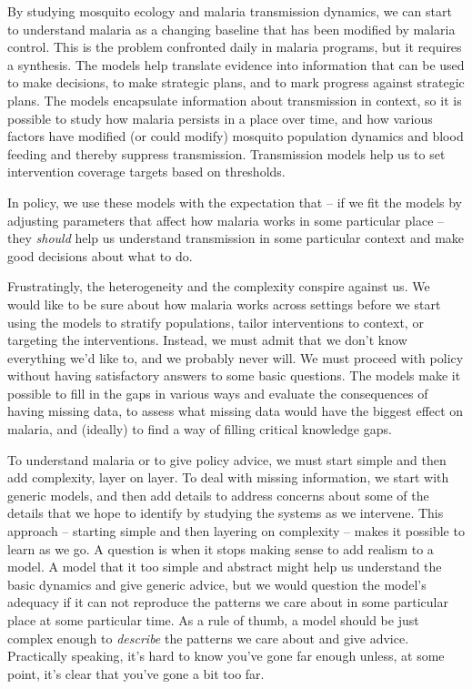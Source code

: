 \documentclass[
]{book}
\begin{document}
By studying mosquito ecology and malaria transmission dynamics, we can start to understand malaria as a changing baseline that has been modified by malaria control. This is the problem confronted daily in malaria programs, but it requires a synthesis. The models help translate evidence into information that can be used to make decisions, to make strategic plans, and to mark progress against strategic plans. The models encapsulate information about transmission in context, so it is possible to study how malaria persists in a place over time, and how various factors have modified (or could modify) mosquito population dynamics and blood feeding and thereby suppress transmission. Transmission models help us to set intervention coverage targets based on thresholds.

In policy, we use these models with the expectation that -- if we fit the models by adjusting parameters that affect how malaria works in some particular place -- they \emph{should} help us understand transmission in some particular context and make good decisions about what to do.

Frustratingly, the heterogeneity and the complexity conspire against us. We would like to be sure about how malaria works across settings before we start using the models to stratify populations, tailor interventions to context, or targeting the interventions. Instead, we must admit that we don't know everything we'd like to, and we probably never will. We must proceed with policy without having satisfactory answers to some basic questions. The models make it possible to fill in the gaps in various ways and evaluate the consequences of having missing data, to assess what missing data would have the biggest effect on malaria, and (ideally) to find a way of filling critical knowledge gaps.

To understand malaria or to give policy advice, we must start simple and then add complexity, layer on layer. To deal with missing information, we start with generic models, and then add details to address concerns about some of the details that we hope to identify by studying the systems as we intervene. This approach -- starting simple and then layering on complexity -- makes it possible to learn as we go. A question is when it stops making sense to add realism to a model. A model that it too simple and abstract might help us understand the basic dynamics and give generic advice, but we would question the model's adequacy if it can not reproduce the patterns we care about in some particular place at some particular time. As a rule of thumb, a model should be just complex enough to \emph{describe} the patterns we care about and give advice. Practically speaking, it's hard to know you've gone far enough unless, at some point, it's clear that you've gone a bit too far.
\end{document}
